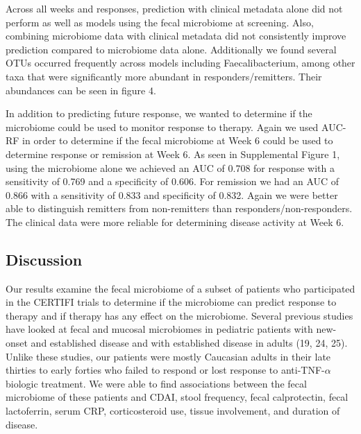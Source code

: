 \documentclass[11pt,]{article}
\begin{document}
Across all weeks and responses, prediction with clinical metadata alone
did not perform as well as models using the fecal microbiome at
screening. Also, combining microbiome data with clinical metadata did
not consistently improve prediction compared to microbiome data alone.
Additionally we found several OTUs occurred frequently across models
including Faecalibacterium, among other taxa that were significantly
more abundant in responders/remitters. Their abundances can be seen in
figure 4.

In addition to predicting future response, we wanted to determine if the
microbiome could be used to monitor response to therapy. Again we used
AUC-RF in order to determine if the fecal microbiome at Week 6 could be
used to determine response or remission at Week 6. As seen in
Supplemental Figure 1, using the microbiome alone we achieved an AUC of
0.708 for response with a sensitivity of 0.769 and a specificity of
0.606. For remission we had an AUC of 0.866 with a sensitivity of 0.833
and specificity of 0.832. Again we were better able to distinguish
remitters from non-remitters than responders/non-responders. The
clinical data were more reliable for determining disease activity at
Week 6.

\subsection{Discussion}\label{discussion}

Our results examine the fecal microbiome of a subset of patients who
participated in the CERTIFI trials to determine if the microbiome can
predict response to therapy and if therapy has any effect on the
microbiome. Several previous studies have looked at fecal and mucosal
microbiomes in pediatric patients with new-onset and established disease
and with established disease in adults (19, 24, 25). Unlike these
studies, our patients were mostly Caucasian adults in their late
thirties to early forties who failed to respond or lost response to
anti-TNF-\({\alpha}\) biologic treatment. We were able to find
associations between the fecal microbiome of these patients and CDAI,
stool frequency, fecal calprotectin, fecal lactoferrin, serum CRP,
corticosteroid use, tissue involvement, and duration of disease.
\end{document}
